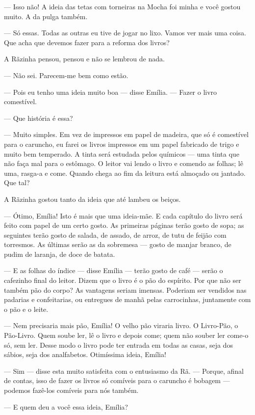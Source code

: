 --- Isso não! A ideia das tetas com torneiras na Mocha foi minha e você
gostou muito. A da pulga também.

--- Só essas. Todas as outras eu tive de jogar no lixo. Vamos ver mais
uma coisa. Que acha que devemos fazer para a reforma dos livros?

A Rãzinha pensou, pensou e não se lembrou de nada.

--- Não sei. Parecem-me bem como estão.

--- Pois eu tenho uma ideia muito boa --- disse Emília. --- Fazer o
livro comestível.

--- Que história é essa?

--- Muito simples. Em vez de impressos em papel de madeira, que só é
comestível para o caruncho, eu farei os livros impressos em um papel
fabricado de trigo e muito bem temperado. A tinta será estudada pelos
químicos --- uma tinta que não faça mal para o estômago. O leitor vai
lendo o livro e comendo as folhas; lê uma, rasga-a e come. Quando chega
ao fim da leitura está almoçado ou jantado. Que tal?

A Rãzinha gostou tanto da ideia que até lambeu os beiços.

--- Ótimo, Emília! Isto é mais que uma ideia-mãe. E cada capítulo do
livro será feito com papel de um certo gosto. As primeiras páginas terão
gosto de sopa; as seguintes terão gosto de salada, de assado, de arroz,
de tutu de feijão com torresmos. As últimas serão as da sobremesa ---
gosto de manjar branco, de pudim de laranja, de doce de batata.

--- E as folhas do índice --- disse Emília --- terão gosto de café ---
serão o cafezinho final do leitor. Dizem que o livro é o pão do
espírito. Por que não ser também pão do corpo? As vantagens seriam
imensas. Poderiam ser vendidos nas padarias e confeitarias, ou entregues
de manhã pelas carrocinhas, juntamente com o pão e o leite.

--- Nem precisaria mais pão, Emília! O velho pão viraria livro. O
Livro-Pão, o Pão-Livro. Quem soube ler, lê o livro e depois come; quem
não souber ler come-o só, sem ler. Desse modo o livro pode ter entrada
em todas as casas, seja dos sábios, seja dos analfabetos. Otimíssima
ideia, Emília!

--- Sim --- disse esta muito satisfeita com o entusiasmo da Rã. ---
Porque, afinal de contas, isso de fazer os livros só comíveis para o
caruncho é bobagem --- podemos fazê-los comíveis para nós também.

--- E quem deu a você essa ideia, Emília?


